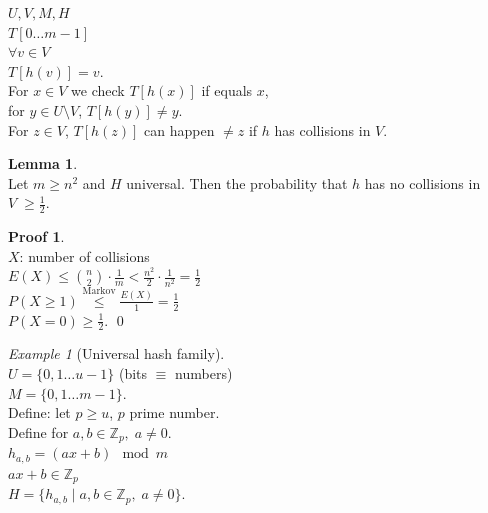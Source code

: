 \documentclass[a4paper, 12pt]{book}
\theoremstyle{definition}
\newtheorem{lemma}[counter]{Lemma}
\newtheorem{pro}[counter]{Proof}
\theoremstyle{remark}
\newtheorem*{ex}{Example}
\newcommand{\Z}{\mathbb{Z}}
\begin{document}
$U, V, M, H$ \\
$T[0 \dots m-1]$ \\
$\forall v \in V$ \\
$T[h(v)] = v$. \\
For $x \in V$ we check $T[h(x)]$ if equals $x$, \\
for $y \in U \setminus V$, $T[h(y)] \neq y$. \\
For $z \in V$, $T[h(z)]$ can happen $\neq z$ if $h$ has collisions in $V$.
\begin{lemma} \text{} \\
  Let $m \geq n^2$ and $H$ universal.
  Then the probability that $h$ has no collisions in $V \; \geq \frac{1}{2}$.
\end{lemma}
\begin{pro} \text{} \\
  $X$: number of collisions \\
  $E(X) \leq \binom{n}{2} \cdot \frac{1}{m} < \frac{n^2}{2} \cdot \frac{1}{n^2} = \frac{1}{2}$ \\
  $P(X \geq 1) \stackrel{\text{Markov}}{\leq} \frac{E(X)}{1} = \frac{1}{2}$ \\
  $P(X = 0) \geq \frac{1}{2}$.
  \qed
\end{pro}
\begin{ex}[Universal hash family] \text{} \\
  $U = \{0, 1 \dots u-1\}$ (bits $\equiv$ numbers) \\
  $M = \{0, 1 \dots m-1\}$. \\
  Define: let $p \geq u$, $p$ prime number. \\
  Define for $a, b \in \Z_p, \; a \neq 0$. \\
  $h_{a,b} = (ax + b) \mod m$ \\
  $ax + b \in \Z_p$ \\
  $H = \{h_{a,b} \mid a, b \in \Z_p, \; a \neq 0\}$.
\end{ex}
\end{document}

